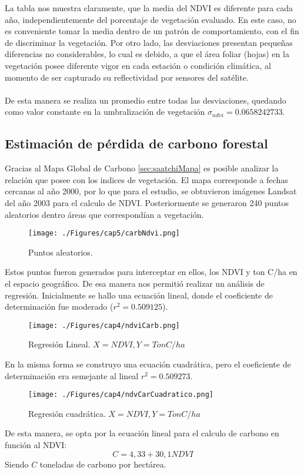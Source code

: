 La tabla nos muestra claramente, que la media del NDVI es diferente para cada a\~{n}o, independientemente del porcentaje de vegetaci\'on evaluado. En este caso, no es conveniente tomar la media dentro de un patrón de comportamiento, con el fin de discriminar la vegetaci\'on. Por otro lado, las desviaciones presentan peque\~{n}as diferencias no considerables, lo cual es debido, a que el \'area foliar (hojas) en la vegetaci\'on posee diferente vigor en cada estaci\'on o condici\'on clim\'atica, al momento de ser capturado su reflectividad por sensores del sat\'elite.\\~\\
De esta manera se realiza un promedio entre todas las desviaciones, quedando como valor constante en la umbralizaci\'on de vegetaci\'on $ \sigma_{ndvi} = 0.0658242733 $.
\subsection{Estimaci\'on de p\'erdida de carbono forestal}\label{subsec:estimacionCarbono}
Gracias al Mapa Global de Carbono \ref{sec:saatchiMapa} es posible analizar la relaci\'on que posee con los indices de vegetaci\'on. El mapa corresponde a fechas cercanas al a\~{n}o 2000, por lo que para el estudio, se obtuvieron im\'agenes Landsat del a\~{n}o 2003 para el calculo de NDVI. Posteriormente se generaron 240 puntos aleatorios dentro \'areas que correspond\'ian a vegetaci\'on.
\begin{figure}[H]
	\centering
	\texttt{[image: ./Figures/cap5/carbNdvi.png]}
	\caption{Puntos aleatorios.}
	\label{fig:aleatorioCrb}
\end{figure}
Estos puntos fueron generados para interceptar en ellos, los NDVI y ton C/ha en el espacio geográfico. De esa manera nos permiti\'o realizar un an\'alisis de regresi\'on. Inicialmente se hallo una ecuaci\'on lineal, donde el coeficiente de determinaci\'on fue moderado ($ r^{2}=0.509125 $).
\begin{figure}[H]
	\centering
	\texttt{[image: ./Figures/cap4/ndviCarb.png]}
	\caption{Regresi\'on Lineal. $ X=NDVI, Y=TonC/ha $}
	\label{fig:linealCar}
\end{figure}
En la misma forma se construyo una ecuaci\'on cuadr\'atica, pero el coeficiente de determinaci\'on era semejante al lineal $ r^{2}=0.509273 $.
\begin{figure}[H]
	\centering
	\texttt{[image: ./Figures/cap4/ndvCarCuadratico.png]}
	\caption{Regresi\'on cuadr\'atica. $ X=NDVI, Y=TonC/ha $}
	\label{fig:cuaCar}
\end{figure}
De esta manera, se opta por la ecuaci\'on lineal para el calculo de carbono en funci\'on al NDVI:
		\begin{equation}
		C=4,33+30,1 NDVI
		\end{equation} 
Siendo $ C $ toneladas de carbono por hect\'area.

